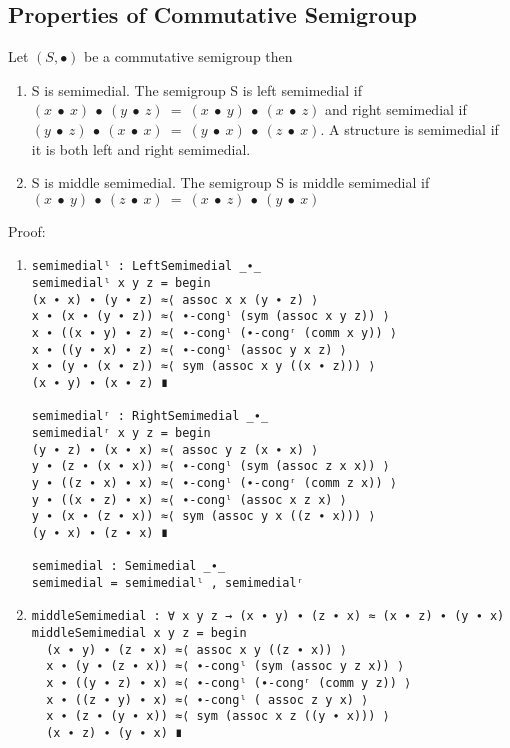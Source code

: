 \subsection{Properties of Commutative Semigroup}
Let $(S, ∙)$ be a commutative semigroup then
\begin{enumerate}
\item S is semimedial. The semigroup S is left semimedial if  \(
(x\ ∙\ x)\ ∙\ (y\ ∙\ z)\ =\ (x\ ∙\ y)\ ∙\ (x\ ∙\ z) \) and right
semimedial if \( (y\ ∙\ z)\ ∙\ (x\ ∙\ x)\ =\ (y\ ∙\ x)\ ∙\ (z\ ∙\ x) \).
A structure is semimedial if it is both left and right semimedial. 
\item S is middle semimedial. The semigroup S is middle semimedial if
\((x\ ∙\ y)\ ∙\ (z\ ∙\ x)\ =\ (x\ ∙\ z)\ ∙\ (y\ ∙\
x)\)
\end{enumerate}
Proof:
\begin{enumerate}
\item
\begin{verbatim}
semimedialˡ : LeftSemimedial _∙_
semimedialˡ x y z = begin
(x ∙ x) ∙ (y ∙ z) ≈⟨ assoc x x (y ∙ z) ⟩
x ∙ (x ∙ (y ∙ z)) ≈⟨ ∙-congˡ (sym (assoc x y z)) ⟩
x ∙ ((x ∙ y) ∙ z) ≈⟨ ∙-congˡ (∙-congʳ (comm x y)) ⟩
x ∙ ((y ∙ x) ∙ z) ≈⟨ ∙-congˡ (assoc y x z) ⟩
x ∙ (y ∙ (x ∙ z)) ≈⟨ sym (assoc x y ((x ∙ z))) ⟩
(x ∙ y) ∙ (x ∙ z) ∎

semimedialʳ : RightSemimedial _∙_
semimedialʳ x y z = begin
(y ∙ z) ∙ (x ∙ x) ≈⟨ assoc y z (x ∙ x) ⟩
y ∙ (z ∙ (x ∙ x)) ≈⟨ ∙-congˡ (sym (assoc z x x)) ⟩
y ∙ ((z ∙ x) ∙ x) ≈⟨ ∙-congˡ (∙-congʳ (comm z x)) ⟩
y ∙ ((x ∙ z) ∙ x) ≈⟨ ∙-congˡ (assoc x z x) ⟩
y ∙ (x ∙ (z ∙ x)) ≈⟨ sym (assoc y x ((z ∙ x))) ⟩
(y ∙ x) ∙ (z ∙ x) ∎

semimedial : Semimedial _∙_
semimedial = semimedialˡ , semimedialʳ
\end{verbatim}
\item
\begin{verbatim}
middleSemimedial : ∀ x y z → (x ∙ y) ∙ (z ∙ x) ≈ (x ∙ z) ∙ (y ∙ x)
middleSemimedial x y z = begin
  (x ∙ y) ∙ (z ∙ x) ≈⟨ assoc x y ((z ∙ x)) ⟩
  x ∙ (y ∙ (z ∙ x)) ≈⟨ ∙-congˡ (sym (assoc y z x)) ⟩
  x ∙ ((y ∙ z) ∙ x) ≈⟨ ∙-congˡ (∙-congʳ (comm y z)) ⟩
  x ∙ ((z ∙ y) ∙ x) ≈⟨ ∙-congˡ ( assoc z y x) ⟩
  x ∙ (z ∙ (y ∙ x)) ≈⟨ sym (assoc x z ((y ∙ x))) ⟩
  (x ∙ z) ∙ (y ∙ x) ∎
\end{verbatim}
\end{enumerate}
